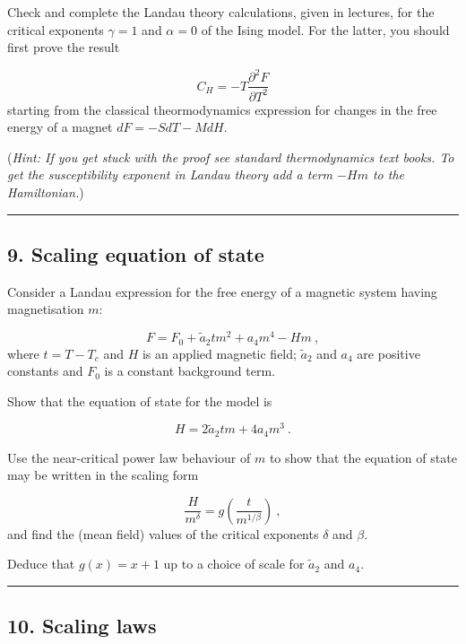 \documentclass[
  letterpaper,
  DIV=11,
  numbers=noendperiod]{scrreprt}
\begin{document}
Check and complete the Landau theory calculations, given in lectures,
for the critical exponents \(\gamma=1\) and \(\alpha=0\) of the Ising
model. For the latter, you should first prove the result

\[C_H =-T\frac{\partial^2 F}{\partial T^2}\] starting from the classical
theormodynamics expression for changes in the free energy of a magnet
\(dF=-SdT-MdH\).

(\emph{Hint: If you get stuck with the proof see standard thermodynamics
text books. To get the susceptibility exponent in Landau theory add a
term \(-Hm\) to the Hamiltonian.})

\begin{center}\rule{0.5\linewidth}{0.5pt}\end{center}

\subsection*{9. Scaling equation of
state}\label{scaling-equation-of-state}

Consider a Landau expression for the free energy of a magnetic system
having magnetisation \(m\):

\[
F=F_0+\tilde{a}_2tm^2+a_4m^4-Hm\:,
\] where \(t=T-T_c\) and \(H\) is an applied magnetic field;
\(\tilde{a}_2\) and \(a_4\) are positive constants and \(F_0\) is a
constant background term.

Show that the equation of state for the model is

\[
H=2\tilde{a}_2tm+4a_4m^3\:.
\]

Use the near-critical power law behaviour of \(m\) to show that the
equation of state may be written in the scaling form

\[
\frac{H}{m^\delta}=g\left(\frac{t}{m^{1/\beta}}\right)\:,
\] and find the (mean field) values of the critical exponents \(\delta\)
and \(\beta\).

Deduce that \(g(x)=x+1\) up to a choice of scale for \(\tilde{a}_2\) and
\(a_4\).

\begin{center}\rule{0.5\linewidth}{0.5pt}\end{center}

\subsection*{10. Scaling laws}\label{scaling-laws}
\end{document}
